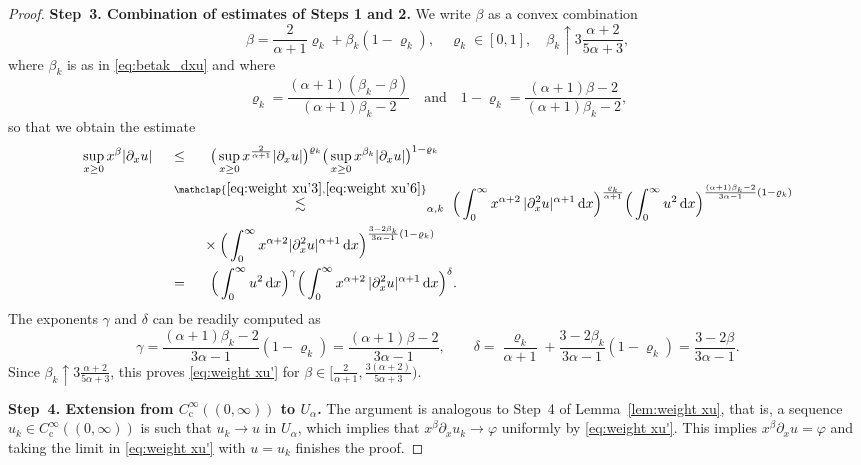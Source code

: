 \documentclass[reqno,12pt]{amsart}
\renewcommand{\d}{\ensuremath{\mathrm{d}}}
\renewcommand{\d}{\ensuremath{{\rm d}}}
\numberwithin{equation}{section}
\begin{document}
\begin{proof}
\noindent\textbf{Step~3. Combination of estimates of Steps 1 and 2.}
%
We write $\beta$ as a convex combination
%
\begin{equation*}
\beta = \frac{2}{\alpha+1} \varrho_k + \beta_k (1-\varrho_k), \quad \varrho_k \in [0,1], \quad \beta_k \uparrow 3 \frac{\alpha+2}{5\alpha+3},
\end{equation*}
%
where $\beta_k$ is as in \eqref{eq:betak_dxu} and where
%
\[
\varrho_k = \frac{(\alpha+1) (\beta_k-\beta)}{(\alpha+1) \beta_k - 2} \quad \text{and} \quad 1-\varrho_k = \frac{(\alpha+1) \beta - 2}{(\alpha+1) \beta_k - 2},
\]
%
so that we obtain the estimate 
%
\begin{align*}
\sup_{x \ge 0} x^{\beta} |\partial_x u| \;\quad &\le_{\phantom{\alpha,k}} \; \big(\sup_{x \ge 0} x^{\frac{2}{\alpha+1}} |\partial_x u|\big)^{\varrho_k} \big(\sup_{x \ge 0} x^{\beta_k} |\partial_x u|\big)^{1-\varrho_k} \\
&\stackrel{\mathclap{\eqref{eq:weight xu'3}, \eqref{eq:weight xu'6}}}{\lesssim}_{\alpha,k} \; \Big(\int_0^\infty  x^{\alpha+2} \, |\partial_x^2 u|^{\alpha+1} \, \d x\Big)^{\frac{\varrho_k}{\alpha +1}} \Big(  \int_0^\infty  u^2 \, \d x \Big)^{\frac{(\alpha+1)\beta_k-2}{3\alpha-1} (1-\varrho_k)} \\
&\phantom{\lesssim_{\alpha,k}} \; \times \Big( \int_0^\infty x^{\alpha+2}
 		|\partial_x^2 u|^{\alpha+1} \, \d x \Big)^{\frac{3-2\beta_k}{3\alpha-1} (1-\varrho_k)} \\
   &=_{\phantom{\alpha,k}} \; \Big(\int_0^\infty u^{2} \, \d x\Big)^\gamma  \Big(\int_0^\infty x^{\alpha+2} \, |\partial_x^2 u|^{\alpha+1} \, \d x\Big)^\delta. %
\end{align*}
%
The exponents \(\gamma\) and \(\delta\) can be readily computed as
%
\begin{equation*}%
\gamma = \frac{(\alpha+1) \beta_k - 2}{3 \alpha - 1} (1-\varrho_k) = \frac{(\alpha +1)\beta-2}{3\alpha -1}, \qquad \delta = \frac{\varrho_k}{\alpha+1} + \frac{3-2\beta_k}{3 \alpha - 1} (1-\varrho_k) = \frac{3-2\beta}{3\alpha -1}.
\end{equation*}
%
Since $\beta_k \uparrow 3 \frac{\alpha+2}{5\alpha+3}$, this proves \eqref{eq:weight xu'} for $\beta \in \big[\frac{2}{\alpha +1}, \frac{3(\alpha+2)}{5\alpha +3}\big)$. 

%
\bigskip
%

\noindent\textbf{Step~4. Extension from $C^\infty_\mathrm{c}((0,\infty))$ to $U_\alpha$.}
The argument is analogous to Step~4 of Lemma~\ref{lem:weight xu}, that is, a sequence $u_k \in C_\mathrm{c}^\infty((0,\infty))$ is such that $u_k \to u$ in $U_\alpha$, which implies that $x^\beta \partial_x u_k \to \varphi$ uniformly by \eqref{eq:weight xu'}. This implies $x^\beta \partial_x u = \varphi$ and taking the limit in \eqref{eq:weight xu'} with $u = u_k$ finishes the proof.
\end{proof}
%
\end{document}
